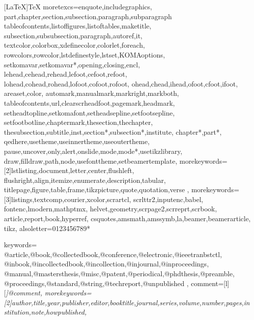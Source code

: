 \usepackage{listings}
[LaTeX]{TeX}%
  {moretexcs={enquote,includegraphics,%
    part,chapter,section,subsection,paragraph,subparagraph%
    tableofcontents,listoffigures,listoftables,maketitle,%
    subsection,subsubsection,paragraph,autoref,it,%
    textcolor,colorbox,xdefinecolor,colorlet,foreach,%
    rowcolors,rowcolor,lstdefinestyle,lstset,KOMAoptions,%
    setkomavar,setkomavar*,opening,closing,encl,%
    lehead,cehead,rehead,lefoot,cefoot,refoot,%
    lohead,cohead,rohead,lofoot,cofoot,rofoot,%
    ohead,chead,ihead,ofoot,cfoot,ifoot,%
    areaset,color,%
    automark,manualmark,markright,markboth,%
    tableofcontents,url,clearscrheadfoot,pagemark,headmark,%
    setheadtopline,setkomafont,setheadsepline,setfootsepline,%
    setfootbotline,chaptermark,thesection,thechapter,%
    thesubsection,subtitle,inst,section*,subsection*,institute,%
    chapter*,part*,%
    qedhere,usetheme,useinnertheme,useoutertheme,%
    pause,uncover,only,alert,onslide,mode,mode*,usetikzlibrary,%
    draw,filldraw,path,node,usefonttheme,setbeamertemplate},%
  morekeywords={[2]lstlisting,document,letter,center,flushleft,%
    flushright,align,itemize,enumerate,description,tabular,%
    titlepage,figure,table,frame,tikzpicture,quote,quotation,verse%
    },%
  morekeywords={[3]listings,textcomp,courier,xcolor,scrartcl,%
    scrlttr2,inputenc,babel,%
    fontenc,lmodern,mathptmx,%
    helvet,geometry,scrpage2,scrreprt,scrbook,%
    article,report,book,hyperref,%
    csquotes,amsmath,amssymb,la,beamer,beamerarticle,%
    tikz},
  alsoletter={0123456789*}
  }%

  {keywords={%
      @article,@book,@collectedbook,@conference,@electronic,@ieeetranbstctl,%
      @inbook,@incollectedbook,@incollection,@injournal,@inproceedings,%
      @manual,@mastersthesis,@misc,@patent,@periodical,@phdthesis,@preamble,%
      @proceedings,@standard,@string,@techreport,@unpublished%
      },
   comment=[l][\itshape]{@comment},
   morekeywords={[2]author,title,year,publisher,editor,booktitle,journal,series,volume,number,pages,institution,note,howpublished},
  }



